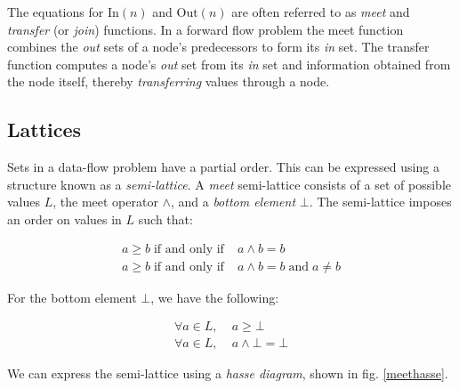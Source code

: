 \documentclass[bsc,twoside,singlespacing,parskip,logo,notimes,normalheadings]{infthesis}
\begin{document}
        The equations for $\text{In}(n)$ and $\text{Out}(n)$ are often
        referred to as {\em meet} and {\em transfer} (or {\em join})
        functions. In a forward flow problem the meet function
        combines the {\em out} sets of a node's predecessors to form
        its {\em in} set. The transfer function computes a node's {\em
          out} set from its {\em in} set and information obtained from
        the node itself, thereby {\em transferring} values through a
        node.

	\subsection{Lattices}
	Sets in a data-flow problem have a partial order. This can be
        expressed using a structure known as a {\em semi-lattice}. A
        {\em meet} semi-lattice consists of a set of possible values
        $L$, the meet operator $\land$, and a {\em bottom element}
        $\bot$. The semi-lattice imposes an order on values in $L$
        such that:
        
        \begin{align}
          a \geq b \;\text{if and only if}\; & a \land b = b \\
          a \ge  b \;\text{if and only if}\; & a \land b = b \;\text{and}\; a \neq b
        \end{align}
        
        For the bottom element $\bot$, we have the following:
        
        \begin{align}
          \forall a \in L,\; & a \geq \bot \\
          \forall a \in L,\; & a \land \bot = \bot
        \end{align}
        
        We can express the semi-lattice using a {\em hasse diagram}, shown in fig. \ref{meethasse}.
\end{document}
